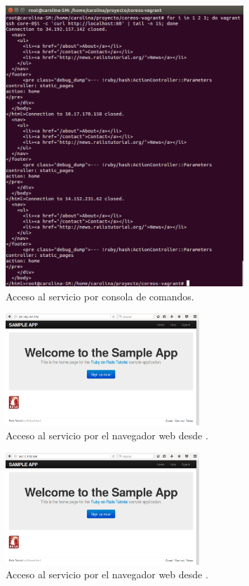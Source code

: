 \begin{figure}[H]
\centering
\includegraphics[width=0.8\textwidth]{images/figures/curl-aws-3.png}
\caption{Acceso al servicio por consola de comandos.}
\end{figure}

\begin{figure}[H]
\centering
\includegraphics[width=0.65\textwidth]{images/figures/nav-1.png}
\caption{Acceso al servicio por el navegador web desde .}
\end{figure}

\begin{figure}[H]
\centering
\includegraphics[width=0.65\textwidth]{images/figures/nav-2.png}
\caption{Acceso al servicio por el navegador web desde .}
\end{figure}


